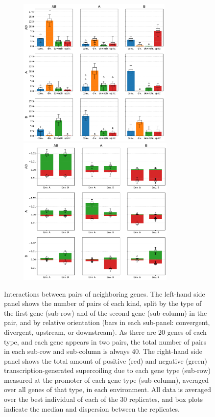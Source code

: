 \begin{figure}[H]
  \centering
  \begin{subfigure}[t]{\textwidth}
    \centering
    \includegraphics[height=7.4cm]{ploscb/img/gene_pair_counts.pdf}
    \includegraphics[height=7.4cm]{ploscb/img/pos_neg_supercoiling_pairs.pdf}
  \end{subfigure}
  \caption{Interactions between pairs of neighboring genes.
  The left-hand side panel shows the number of pairs of each kind, split by the type of the first gene (sub-row) and of the second gene (sub-column) in the pair, and by relative orientation (bars in each sub-panel: convergent, divergent, upstream, or downstream).
  As there are 20 genes of each type, and each gene appears in two pairs, the total number of pairs in each sub-row and sub-column is always 40.
  The right-hand side panel shows the total amount of positive (red) and negative (green) transcription-generated supercoiling due to each gene type (sub-row) measured at the promoter of each gene type (sub-column), averaged over all genes of that type, in each environment.
  All data is averaged over the best individual of each of the 30 replicates, and box plots indicate the median and dispersion between the replicates.}
  \label{fig:pair_results}
\end{figure}

